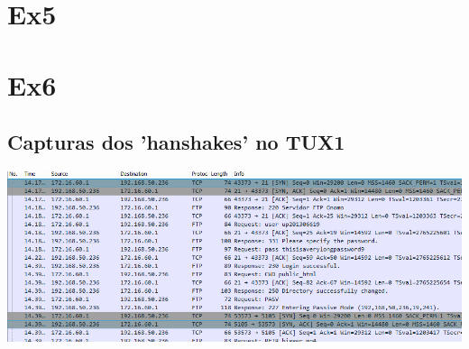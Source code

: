 \documentclass[11pt,a4paper,reqno]{report}
\numberwithin{equation}{section}
\begin{document}
\begin{appendices}
\section{Ex5}%

\section{Ex6}%

\subsection{Capturas dos 'hanshakes' no TUX1}
\label{ex6_tux1_handshakes}
\includegraphics[width=18cm]{ex6_tux1_handshakes.png}


\end{appendices}
\end{document}
